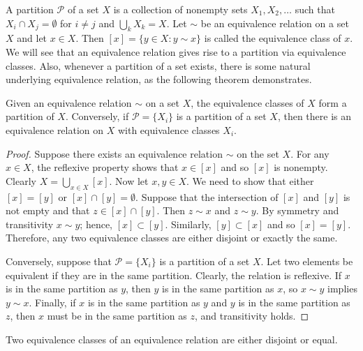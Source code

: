 A {\bfi partition} ${\mathcal P}$ of a set $X$ is a collection of nonempty sets $X_1, X_2, \ldots$ such that $X_i \cap X_j = \emptyset$ for $i  \neq j$ and $\bigcup_k X_k = X$. Let $\sim$ be an equivalence relation on a set $X$ and let $x \in X$.  Then $[x] = \{ y \in X : y \sim x \}$ is called the {\bfi equivalence class\/} of $x$.  We will see that an equivalence relation gives rise to a partition via equivalence classes.  Also, whenever a partition of a set exists, there is some natural  underlying equivalence relation, as the following theorem demonstrates.  
 
\begin{theorem}\label{sets_theorem_partitions}
Given an equivalence relation $\sim$ on a set $X$, the equivalence classes of $X$ form a partition of $X$.  Conversely, if ${\mathcal P} = \{ X_i\}$ is a partition of a set $X$, then there is an equivalence relation on $X$ with equivalence classes $X_i$. 
\end{theorem}

\begin{proof}
Suppose there exists an equivalence relation $\sim$ on the set $X$.  For any $x \in X$, the reflexive property shows that $x \in [x]$ and so $[x]$ is nonempty.  Clearly $X = \bigcup_{x \in X} [x]$.  Now let $x, y \in X$. We need to show that either $[x] = [y]$ or $[x] \cap [y] = \emptyset$.  Suppose that the intersection of $[x]$ and $[y]$ is not empty and that $z \in [x] \cap [y]$. Then $z \sim x$ and $z \sim y$.  By symmetry and transitivity $x \sim y$; hence, $[x] \subset [y]$.  Similarly, $[y] \subset [x]$ and so $[x] = [y]$.  Therefore, any two equivalence classes are either disjoint or exactly the same.
 
Conversely, suppose that ${\mathcal P} = \{X_i\}$ is a partition of a set $X$.  Let two elements be equivalent if they are in the same partition.  Clearly, the relation is reflexive.  If $x$ is in the same partition as $y$, then $y$ is in the same partition as $x$, so $x \sim y$ implies $y \sim x$.  Finally, if $x$ is in the same partition as $y$ and $y$ is in the same partition as $z$, then $x$ must be in the same partition as $z$, and transitivity holds.
\end{proof}

\begin{corollary}\label{sets_theorem_equivalence_classes}
Two equivalence classes of an equivalence relation are either disjoint or equal.
\end{corollary}
 
